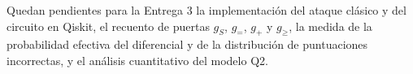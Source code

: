 Quedan pendientes para la Entrega 3 la implementación del ataque clásico y del circuito en Qiskit, el recuento de puertas \(g_S\), \(g_{=}\), \(g_{+}\) y \(g_{\ge}\), la medida de la probabilidad efectiva del diferencial y de la distribución de puntuaciones incorrectas, y el análisis cuantitativo del modelo Q2.
